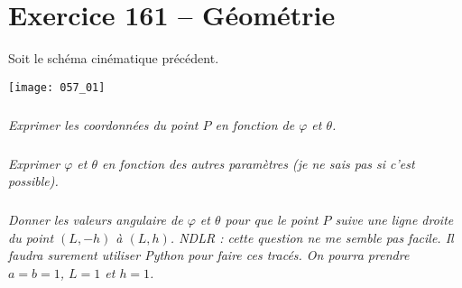 \section*{Exercice 161 -- Géométrie}

\setcounter{exo}{0}
Soit le schéma cinématique précédent. 
\begin{center}
\texttt{[image: 057\_01]}
\end{center}



\subparagraph{}
\textit{Exprimer les coordonnées du point $P$ en fonction de $\varphi$ et $\theta$.}
\ifprof
\begin{corrige}

\end{corrige}
\else
\fi



\subparagraph{}
\textit{Exprimer $\varphi$ et $\theta$ en fonction des autres paramètres (je ne sais pas si c'est possible).}
\ifprof
\begin{corrige}

\end{corrige}
\else
\fi


\subparagraph{}
\textit{Donner les valeurs angulaire de $\varphi$ et $\theta$ pour que le point $P$ suive une ligne droite du point $(L,-h)$ à $(L,h)$. NDLR : cette question ne me semble pas facile. Il faudra surement utiliser Python pour faire ces tracés. On pourra prendre $a=b=1$, $L=1$ et $h=1$.}
\ifprof
\begin{corrige}
\end{corrige}
\else
\fi
